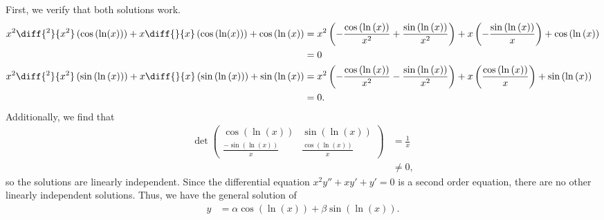 \documentclass[10pt]{mypackage}
\begin{document}
\begin{solution}[Problem 28]
  First, we verify that both solutions work.
  {\footnotesize
    \begin{align*}
    x^2 \diff{^2}{x^2}\left(\cos\left(\ln(x)\right)\right) + x \diff{}{x}\left(\cos\left(\ln(x)\right)\right) + \cos\left(\ln\left(x\right)\right) &= x^2\left(-\frac{\cos\left(\ln\left(x\right)\right)}{x^2} + \frac{\sin\left(\ln\left(x\right)\right)}{x^2}\right) + x\left(-\frac{\sin\left(\ln\left(x\right)\right)}{x}\right) + \cos\left(\ln\left(x\right)\right)\\
                                                                                                                                                   &= 0\\
    x^2 \diff{^2}{x^2}\left(\sin\left(\ln\left(x\right)\right)\right) + x \diff{}{x}\left(\sin\left(\ln\left(x\right)\right)\right) + \sin\left(\ln\left(x\right)\right) &= x^2 \left(-\frac{\cos\left(\ln\left(x\right)\right)}{x^2} - \frac{\sin\left(\ln\left(x\right)\right)}{x^2}\right) + x\left(\frac{\cos\left(\ln\left(x\right)\right)}{x}\right) + \sin\left(\ln\left(x\right)\right)\\
                                                                                                                                                                         &= 0.
  \end{align*}
}
Additionally, we find that
\begin{align*}
  \det \begin{pmatrix}\cos\left(\ln\left(x\right)\right) & \sin\left(\ln\left(x\right)\right) \\ \frac{-\sin\left(\ln\left(x\right)\right)}{x} & \frac{\cos\left(\ln\left(x\right)\right)}{x}\end{pmatrix} &= \frac{1}{x}\\
                                                         &\neq 0,
\end{align*}
so the solutions are linearly independent. Since the differential equation $x^2y'' + xy' + y' = 0$ is a second order equation, there are no other linearly independent solutions. Thus, we have the general solution of
\begin{align*}
  y &= \alpha \cos\left(\ln\left(x\right)\right) + \beta \sin\left(\ln\left(x\right)\right).
\end{align*}
\end{solution}
\end{document}

